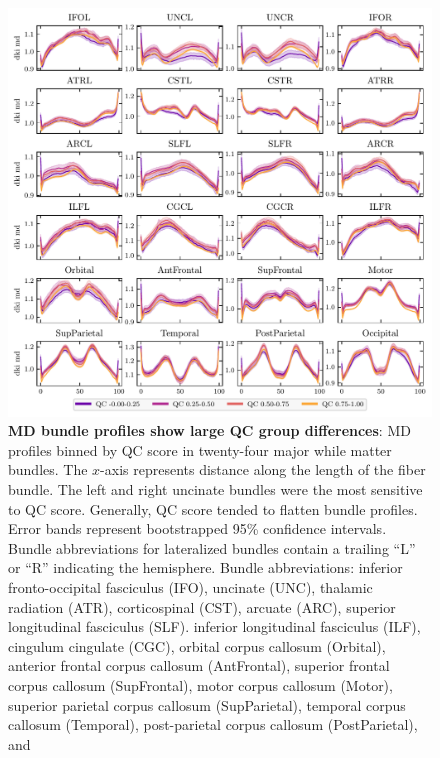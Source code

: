 \documentclass[9pt,lineno]{elife}
\begin{document}
\begin{figure}[tbp]
\begin{fullwidth}
    \centering
    \includegraphics[width=\linewidth]{bundle-profiles/qc-bins-dki-md.pdf}
    \caption{%
        {\bf MD bundle profiles show large QC group differences}:
        MD profiles binned by QC score in twenty-four major while matter
        bundles.  The $x$-axis represents distance along the length of the fiber
        bundle.
        The left and right uncinate bundles were the most sensitive
        to QC score. Generally, QC score tended to flatten bundle profiles.
        Error bands represent bootstrapped 95\% confidence intervals. Bundle
        abbreviations for lateralized bundles contain a trailing ``L'' or ``R''
        indicating the hemisphere. Bundle abbreviations:
        inferior fronto-occipital fasciculus (IFO),
        uncinate (UNC),
        thalamic radiation (ATR),
        corticospinal (CST),
        arcuate (ARC),
        superior longitudinal fasciculus (SLF).
        inferior longitudinal fasciculus (ILF),
        cingulum cingulate (CGC),
        orbital corpus callosum (Orbital),
        anterior frontal corpus callosum (AntFrontal),
        superior frontal corpus callosum (SupFrontal),
        motor corpus callosum (Motor),
        superior parietal corpus callosum (SupParietal),
        temporal corpus callosum (Temporal),
        post-parietal corpus callosum (PostParietal), and
}
\end{fullwidth}
\end{figure}
\end{document}
